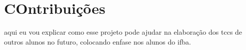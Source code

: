 \section{COntribuições}


aqui eu vou explicar como esse projeto pode ajudar na elaboração dos tccs de outros alunos no futuro, colocando enfase nos alunos do ifba.